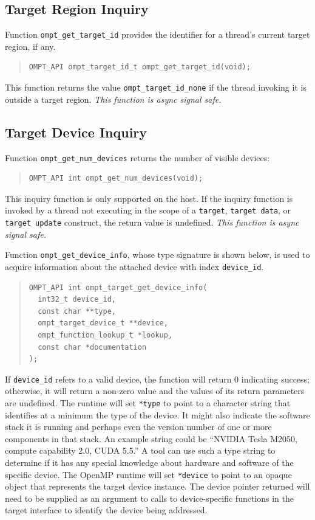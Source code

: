\documentclass{article}
\begin{document}
\subsection{Target Region Inquiry}
\label{sec:target-region}

Function \verb|ompt_get_target_id| provides the identifier for a thread's current target region, if any.
\begin{quote}
\begin{verbatim}
OMPT_API ompt_target_id_t ompt_get_target_id(void);
\end{verbatim}
\end{quote}
This function returns the value \verb|ompt_target_id_none| if the thread invoking it is outside a target region.  {\em This function is async signal safe.}

\subsection{Target Device Inquiry}
\label{sec:target-device}
Function \verb|ompt_get_num_devices| returns the number of visible devices:
\begin{quote}
\begin{verbatim}
OMPT_API int ompt_get_num_devices(void);
\end{verbatim}
\end{quote}
This inquiry function is only supported on the host. If the inquiry function is invoked by a thread not executing in the scope of a {\tt target}, {\tt target data}, or {\tt target update} construct, the return value is undefined. {\it This function is async signal safe.}

Function \verb|ompt_get_device_info|, whose type signature is shown below, is used to acquire information about the attached device with  index \verb|device_id|. 
\begin{quote}
\begin{verbatim}
OMPT_API int ompt_target_get_device_info(
  int32_t device_id, 
  const char **type, 
  ompt_target_device_t **device,
  ompt_function_lookup_t *lookup,
  const char *documentation
);
\end{verbatim}
\end{quote}
If \verb|device_id| refers to a valid device, the function will return 0 indicating success; otherwise, it will return a non-zero value and the values of its return parameters are undefined. The runtime will set \verb|*type| to point to a character string that identifies at a minimum the  type of the device. It might also indicate the software stack it is running and perhaps even the version number of one or more components in that stack. An example string could be ``NVIDIA Tesla M2050, compute capability 2.0, CUDA 5.5.'' A tool can use such a type string to determine if it has any special knowledge about hardware and software of the specific device. The OpenMP runtime will set \verb|*device| to point to an opaque object that represents the target device instance. The device pointer returned will need to be supplied as an argument to calls to device-specific functions in the target interface to identify the device being addressed.
\end{document}
